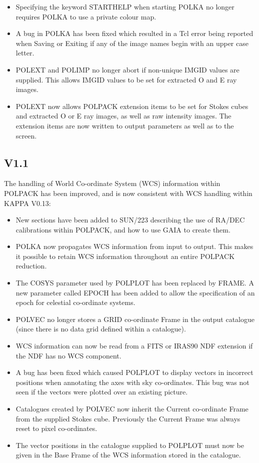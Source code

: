 \documentclass[twoside,11pt]{article}
\newcommand{\htmlref}[2]{#1}
\renewcommand{\_}{\texttt{\symbol{95}}}
\begin{document}
\begin{itemize}
\item Specifying the keyword STARTHELP when starting \htmlref{POLKA}{POLKA} 
no longer requires POLKA to use a private colour map.

\item A bug in \htmlref{POLKA}{POLKA} has been fixed which resulted in a
Tcl error being reported when Saving or Exiting if any of the image names 
begin with an upper case letter.

\item \htmlref{POLEXT}{POLEXT} and \htmlref{POLIMP}{POLIMP} no longer abort
if non-unique IMGID values are supplied. This allows IMGID values to be set 
for  extracted O and E ray images.

\item \htmlref{POLEXT}{POLEXT} now allows POLPACK extension items to be
set for Stokes cubes and extracted O or E ray images, as well as raw
intensity images. The extension items are now written to output
parameters as well as to the screen.

\end{itemize}



\subsection{V1.1}
The handling of World Co-ordinate System (WCS) information within POLPACK
has been improved, and is now consistent with WCS handling within KAPPA
V0.13:

\begin{itemize}
\item New sections have been added to SUN/223 describing the use of
RA/DEC calibrations within POLPACK, and how to use GAIA to create them.
\item POLKA now propagates WCS information from input to output. This makes
it possible to retain WCS information throughout an entire POLPACK
reduction. 
\item The COSYS parameter used by POLPLOT has been replaced by FRAME. 
A new parameter called EPOCH has been added to allow the specification of 
an epoch for celestial co-ordinate systems.
\item POLVEC no longer stores a GRID co-ordinate Frame in the output
catalogue (since there is no data grid defined within a catalogue).
\item WCS information can now be read from a FITS or IRAS90 NDF extension
if the NDF has no WCS component.
\item A bug has been fixed which caused POLPLOT to display vectors in 
incorrect positions when annotating the axes with sky co-ordinates. This bug
was not seen if the vectors were plotted over an existing picture.
\item Catalogues created by POLVEC now inherit the Current co-ordinate Frame 
from the supplied Stokes cube. Previously the Current Frame was always reset to
pixel co-ordinates.
\item The vector positions in the catalogue supplied to POLPLOT must now
be given in the Base Frame of the WCS information stored in the catalogue.
\end{itemize}
\end{document}
